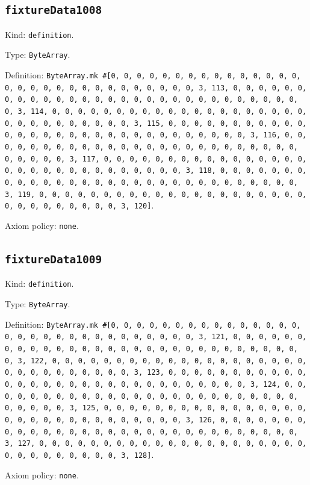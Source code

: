 \documentclass[11pt]{article}
\begin{document}
\subsection*{\texttt{fixtureData1008}}
\noindent Kind: \texttt{definition}.\par
\noindent Type: \texttt{ByteArray}.\par
\noindent Definition: \texttt{ByteArray.mk \#[0, 0, 0, 0, 0, 0, 0, 0, 0, 0, 0, 0, 0, 0, 0, 0, 0, 0, 0, 0, 0, 0, 0, 0, 0, 0, 0, 0, 0, 0, 3, 113, 0, 0, 0, 0, 0, 0, 0, 0, 0, 0, 0, 0, 0, 0, 0, 0, 0, 0, 0, 0, 0, 0, 0, 0, 0, 0, 0, 0, 0, 0, 3, 114, 0, 0, 0, 0, 0, 0, 0, 0, 0, 0, 0, 0, 0, 0, 0, 0, 0, 0, 0, 0, 0, 0, 0, 0, 0, 0, 0, 0, 0, 0, 3, 115, 0, 0, 0, 0, 0, 0, 0, 0, 0, 0, 0, 0, 0, 0, 0, 0, 0, 0, 0, 0, 0, 0, 0, 0, 0, 0, 0, 0, 0, 0, 3, 116, 0, 0, 0, 0, 0, 0, 0, 0, 0, 0, 0, 0, 0, 0, 0, 0, 0, 0, 0, 0, 0, 0, 0, 0, 0, 0, 0, 0, 0, 0, 3, 117, 0, 0, 0, 0, 0, 0, 0, 0, 0, 0, 0, 0, 0, 0, 0, 0, 0, 0, 0, 0, 0, 0, 0, 0, 0, 0, 0, 0, 0, 0, 3, 118, 0, 0, 0, 0, 0, 0, 0, 0, 0, 0, 0, 0, 0, 0, 0, 0, 0, 0, 0, 0, 0, 0, 0, 0, 0, 0, 0, 0, 0, 0, 3, 119, 0, 0, 0, 0, 0, 0, 0, 0, 0, 0, 0, 0, 0, 0, 0, 0, 0, 0, 0, 0, 0, 0, 0, 0, 0, 0, 0, 0, 0, 0, 3, 120]}.\par
\noindent Axiom policy: \texttt{none}.\par
\subsection*{\texttt{fixtureData1009}}
\noindent Kind: \texttt{definition}.\par
\noindent Type: \texttt{ByteArray}.\par
\noindent Definition: \texttt{ByteArray.mk \#[0, 0, 0, 0, 0, 0, 0, 0, 0, 0, 0, 0, 0, 0, 0, 0, 0, 0, 0, 0, 0, 0, 0, 0, 0, 0, 0, 0, 0, 0, 3, 121, 0, 0, 0, 0, 0, 0, 0, 0, 0, 0, 0, 0, 0, 0, 0, 0, 0, 0, 0, 0, 0, 0, 0, 0, 0, 0, 0, 0, 0, 0, 3, 122, 0, 0, 0, 0, 0, 0, 0, 0, 0, 0, 0, 0, 0, 0, 0, 0, 0, 0, 0, 0, 0, 0, 0, 0, 0, 0, 0, 0, 0, 0, 3, 123, 0, 0, 0, 0, 0, 0, 0, 0, 0, 0, 0, 0, 0, 0, 0, 0, 0, 0, 0, 0, 0, 0, 0, 0, 0, 0, 0, 0, 0, 0, 3, 124, 0, 0, 0, 0, 0, 0, 0, 0, 0, 0, 0, 0, 0, 0, 0, 0, 0, 0, 0, 0, 0, 0, 0, 0, 0, 0, 0, 0, 0, 0, 3, 125, 0, 0, 0, 0, 0, 0, 0, 0, 0, 0, 0, 0, 0, 0, 0, 0, 0, 0, 0, 0, 0, 0, 0, 0, 0, 0, 0, 0, 0, 0, 3, 126, 0, 0, 0, 0, 0, 0, 0, 0, 0, 0, 0, 0, 0, 0, 0, 0, 0, 0, 0, 0, 0, 0, 0, 0, 0, 0, 0, 0, 0, 0, 3, 127, 0, 0, 0, 0, 0, 0, 0, 0, 0, 0, 0, 0, 0, 0, 0, 0, 0, 0, 0, 0, 0, 0, 0, 0, 0, 0, 0, 0, 0, 0, 3, 128]}.\par
\noindent Axiom policy: \texttt{none}.\par
\end{document}
